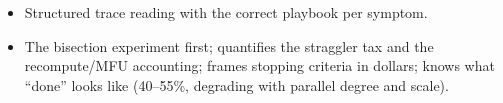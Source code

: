 \begin{interviewq}
\goodgreat
\begin{itemize}
    \item {} Structured trace reading with the correct playbook per symptom.
    \item {} The bisection experiment first; quantifies the straggler tax and the recompute/MFU accounting; frames stopping criteria in dollars; knows what ``done'' looks like (40--55\%, degrading with parallel degree and scale).
\end{itemize}

\end{interviewq}

